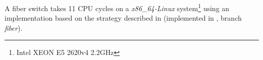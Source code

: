 
A fiber switch takes 11 CPU cycles on a \emph{x86\_64-Linux}
system\footnote{Intel XEON E5 2620v4 2.2GHz} using an implementation based on
the strategy described in  (implemented in
\bcontext\cite{bcontext}, branch \emph{fiber}).
